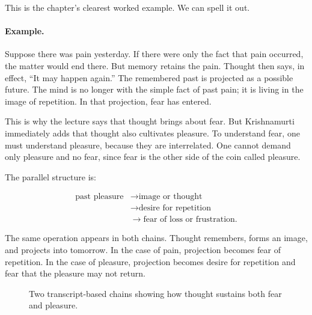 This is the chapter's clearest worked example. We can spell it out.

\paragraph{Example.} Suppose there was pain yesterday. If there were only the fact that pain occurred, the matter would end there. But memory retains the pain. Thought then says, in effect, ``It may happen again.'' The remembered past is projected as a possible future. The mind is no longer with the simple fact of past pain; it is living in the image of repetition. In that projection, fear has entered.

This is why the lecture says that thought brings about fear. But Krishnamurti immediately adds that thought also cultivates pleasure. To understand fear, one must understand pleasure, because they are interrelated. One cannot demand only pleasure and no fear, since fear is the other side of the coin called pleasure.

The parallel structure is:

\begin{align}
\text{past pleasure}
&\longrightarrow \text{image or thought} \\
&\longrightarrow \text{desire for repetition} \\
&\longrightarrow \text{fear of loss or frustration}.
\end{align}

The same operation appears in both chains. Thought remembers, forms an image, and projects into tomorrow. In the case of pain, projection becomes fear of repetition. In the case of pleasure, projection becomes desire for repetition and fear that the pleasure may not return.

\begin{figure}
\centering
{}
\caption{Two transcript-based chains showing how thought sustains both fear and pleasure.}
\end{figure}

